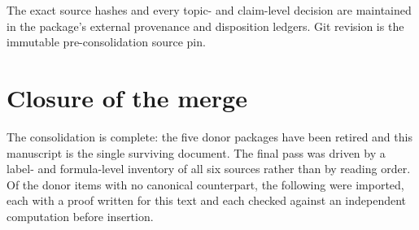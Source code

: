 \documentclass[11pt,a4paper,oneside,openany]{book}
\theoremstyle{definition}
\theoremstyle{remark}
\begin{document}
The exact source hashes and every topic- and claim-level decision are maintained
in the package's external provenance and disposition ledgers.  Git revision
 is the immutable
pre-consolidation source pin.

\section{Closure of the merge}
\label{sec:merged-closure}

The consolidation is complete: the five donor packages have been retired and
this manuscript is the single surviving document.  The final pass was driven by
a label- and formula-level inventory of all six sources rather than by reading
order.  Of the donor items with no canonical counterpart, the following were
imported, each with a proof written for this text and each checked against an
independent computation before insertion.
\end{document}
